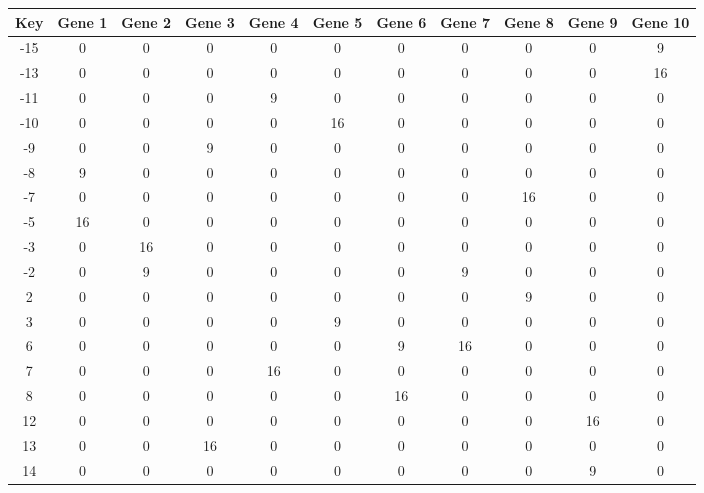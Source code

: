 \begin{tabular}{|c|c|c|c|c|c|c|c|c|c|c|}
\hline
Key & Gene 1 & Gene 2 & Gene 3 & Gene 4 & Gene 5 & Gene 6 & Gene 7 & Gene 8 & Gene 9 & Gene 10 \\
\hline
-15 & 0 & 0 & 0 & 0 & 0 & 0 & 0 & 0 & 0 & 9 \\
-13 & 0 & 0 & 0 & 0 & 0 & 0 & 0 & 0 & 0 & 16 \\
-11 & 0 & 0 & 0 & 9 & 0 & 0 & 0 & 0 & 0 & 0 \\
-10 & 0 & 0 & 0 & 0 & 16 & 0 & 0 & 0 & 0 & 0 \\
-9 & 0 & 0 & 9 & 0 & 0 & 0 & 0 & 0 & 0 & 0 \\
-8 & 9 & 0 & 0 & 0 & 0 & 0 & 0 & 0 & 0 & 0 \\
-7 & 0 & 0 & 0 & 0 & 0 & 0 & 0 & 16 & 0 & 0 \\
-5 & 16 & 0 & 0 & 0 & 0 & 0 & 0 & 0 & 0 & 0 \\
-3 & 0 & 16 & 0 & 0 & 0 & 0 & 0 & 0 & 0 & 0 \\
-2 & 0 & 9 & 0 & 0 & 0 & 0 & 9 & 0 & 0 & 0 \\
2 & 0 & 0 & 0 & 0 & 0 & 0 & 0 & 9 & 0 & 0 \\
3 & 0 & 0 & 0 & 0 & 9 & 0 & 0 & 0 & 0 & 0 \\
6 & 0 & 0 & 0 & 0 & 0 & 9 & 16 & 0 & 0 & 0 \\
7 & 0 & 0 & 0 & 16 & 0 & 0 & 0 & 0 & 0 & 0 \\
8 & 0 & 0 & 0 & 0 & 0 & 16 & 0 & 0 & 0 & 0 \\
12 & 0 & 0 & 0 & 0 & 0 & 0 & 0 & 0 & 16 & 0 \\
13 & 0 & 0 & 16 & 0 & 0 & 0 & 0 & 0 & 0 & 0 \\
14 & 0 & 0 & 0 & 0 & 0 & 0 & 0 & 0 & 9 & 0 \\
\hline
\end{tabular}